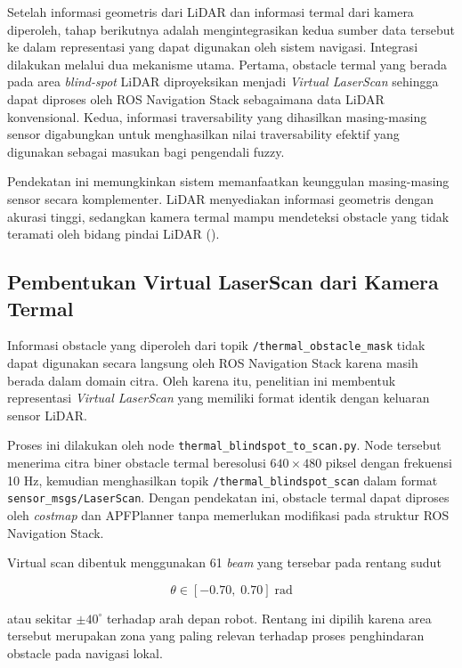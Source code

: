 Setelah informasi geometris dari LiDAR dan informasi termal dari kamera diperoleh, tahap berikutnya adalah mengintegrasikan kedua sumber data tersebut ke dalam representasi yang dapat digunakan oleh sistem navigasi. Integrasi dilakukan melalui dua mekanisme utama. Pertama, obstacle termal yang berada pada area \textit{blind-spot} LiDAR diproyeksikan menjadi \textit{Virtual LaserScan} sehingga dapat diproses oleh ROS Navigation Stack sebagaimana data LiDAR konvensional. Kedua, informasi traversability yang dihasilkan masing-masing sensor digabungkan untuk menghasilkan nilai traversability efektif yang digunakan sebagai masukan bagi pengendali fuzzy.

Pendekatan ini memungkinkan sistem memanfaatkan keunggulan masing-masing sensor secara komplementer. LiDAR menyediakan informasi geometris dengan akurasi tinggi, sedangkan kamera termal mampu mendeteksi obstacle yang tidak teramati oleh bidang pindai LiDAR (\cite{Choi2023,Schichler2025}).

\subsection{Pembentukan Virtual LaserScan dari Kamera Termal}
\label{sec:virtual_laserscan}

Informasi obstacle yang diperoleh dari topik \texttt{/thermal\_obstacle\_mask} tidak dapat digunakan secara langsung oleh ROS Navigation Stack karena masih berada dalam domain citra. Oleh karena itu, penelitian ini membentuk representasi \textit{Virtual LaserScan} yang memiliki format identik dengan keluaran sensor LiDAR.

Proses ini dilakukan oleh node \texttt{thermal\_blindspot\_to\_scan.py}. Node tersebut mene\-rima citra biner obstacle termal beresolusi $640 \times 480$ piksel dengan frekuensi 10 Hz, kemudian menghasilkan topik \texttt{/thermal\_blindspot\_scan} dalam format \texttt{sensor\_msgs/LaserScan}. Dengan pendekatan ini, obstacle termal dapat diproses oleh \textit{costmap} dan APFPlanner tanpa memerlukan modifikasi pada struktur ROS Navigation Stack.

Virtual scan dibentuk menggunakan 61 \textit{beam} yang tersebar pada rentang sudut

\begin{equation}
\theta \in [-0.70,\;0.70]\;\text{rad}
\end{equation}

atau sekitar $\pm 40^\circ$ terhadap arah depan robot. Rentang ini dipilih karena area tersebut merupakan zona yang paling relevan terhadap proses penghindaran obstacle pada navigasi lokal.

